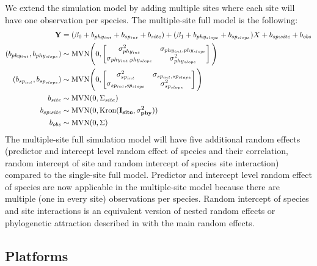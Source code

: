 We extend the simulation model by adding multiple sites where each site will have one observation per species. The multiple-site full model is the following: 
\begin{align}
{\mathbf Y} & = (\beta_0 + b_{phy_{int}} + b_{sp_{int}} + b_{site}) + (\beta_1 + b_{phy_{slope}} + b_{sp_{slope}}) X + b_{sp:site} + b_{obs}\\
(b_{phy_{int}}, b_{phy_{slope}}) & \sim \textrm{MVN} \Bigg( 0, \begin{bmatrix}
\sigma^2_{phy_{int}} & \sigma_{phy_{int},phy_{slope}} \\ 
\sigma_{phy_{int},phy_{slope}} & \sigma^2_{phy_{slope}}
\end{bmatrix}
\Bigg) \\
(b_{sp_{int}}, b_{sp_{slope}}) & \sim \textrm{MVN} \Bigg( 0, \begin{bmatrix}
\sigma^2_{sp_{int}} & \sigma_{sp_{int},sp_{slope}} \\ 
\sigma_{sp_{int},sp_{slope}} & \sigma^2_{sp_{slope}}
\end{bmatrix}
\Bigg) \\
b_{site} & \sim \textrm{MVN} ( 0 , \Sigma_{site}) \\
b_{sp:site} & \sim \textrm{MVN} (0, \textrm{Kron}(\bf{I}_{site}, \sigma^2_{phy})) \\
b_{obs} & \sim \textrm{MVN} ( 0 , \Sigma)
\end{align}
The multiple-site full simulation model will have five additional random effects (predictor and intercept level random effect of species and their correlation, random intercept of site and random intercept of species site interaction) compared to the single-site full model.
Predictor and intercept level random effect of species are now applicable in the multiple-site model because there are multiple (one in every site) observations per species. 
Random intercept of species and site interactions is an equivalent version of nested random effects or phylogenetic attraction described in \cite{helmus2007separating} with the main random effects.

\subsection{Platforms}

